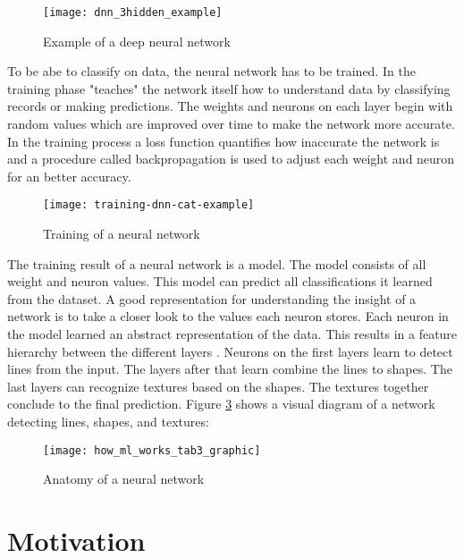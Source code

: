 \begin{figure}[H]
    \centering
    \texttt{[image: dnn\_3hidden\_example]}
    \caption{\cite{dnn_3hidden_example_image} Example of a deep neural network}
    \label{fig:dnn_3hidden_example}
\end{figure}

To be abe to classify on data, the neural network has to be trained.
In the training phase "teaches" the network itself how to understand data by classifying records or making predictions. \cite{ibm-watson-healthcare}
The weights and neurons on each layer begin with random values which are improved over time to make the network more accurate.
In the training process a loss function quantifies how inaccurate the network is and a procedure called backpropagation is used to adjust each weight and neuron for an better accuracy.
\cite{nvidia-ai-explained, tensorflow-about}

\begin{figure}[H]
    \centering
    \texttt{[image: training-dnn-cat-example]}
    \caption{\cite{tf_dnn_training_cat_example} Training of a neural network}
    \label{fig:tf_dnn_training_cat_example}
\end{figure}

The training result of a neural network is a model.
The model consists of all weight and neuron values.
\hfill \break
This model can predict all classifications it learned from the dataset.
A good representation for understanding the insight of a network is to take a closer look to the values each neuron stores.
Each neuron in the model learned an abstract representation of the data.
This results in a feature hierarchy between the different layers \cite{skymind_neural_network}.
Neurons on the first layers learn to detect lines from the input.
The layers after that learn combine the lines to shapes.
The last layers can recognize textures based on the shapes.
The textures together conclude to the final prediction.
Figure \ref{fig:tf_dnn_shapes_textures} shows a visual diagram of a network detecting lines, shapes, and textures:
\cite{nvidia-ai-explained, tensorflow-about}

\begin{figure}[H]
    \centering
    \texttt{[image: how\_ml\_works\_tab3\_graphic]}
    \caption{\cite{tf_dnn_shapes_textures} Anatomy of a neural network}
    \label{fig:tf_dnn_shapes_textures}
\end{figure}

\section{Motivation}

